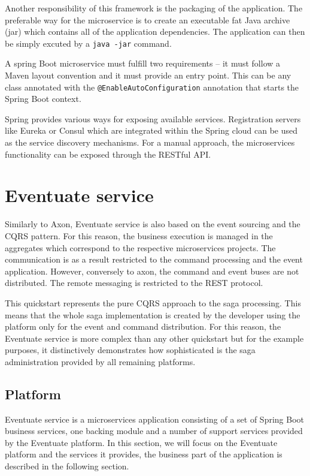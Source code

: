 \documentclass[oneside,
  digital, %
  table,   %
  nolof,     %
  nolot,     %
]{fithesis3}
\begin{document}
Another responsibility of this framework is the packaging of the application. The preferable way for the microservice is to create an executable fat Java archive (jar) which contains all of the application dependencies. The application can then be simply excuted by a \texttt{java -jar} command.

A spring Boot microservice must fulfill two requirements -- it must follow a Maven layout convention and it must provide an entry point. This can be any class annotated with the \texttt{@EnableAutoConfiguration} annotation that starts the Spring Boot context.

Spring provides various ways for exposing available services. Registration servers like Eureka or Consul which are integrated within the Spring cloud \cite{spring_cloud} can be used as the service discovery mechanisms. For a manual approach, the microservices functionality can be exposed through the RESTful API.



\section{Eventuate service}

Similarly to Axon, Eventuate service is also based on the event sourcing and the CQRS pattern. For this reason, the business execution is managed in the aggregates which correspond to the respective microservices projects. The communication is as a result restricted to the command processing and the event application. However, conversely to axon, the command and event buses are not distributed. The remote messaging is restricted to the REST protocol.

This quickstart represents the pure CQRS approach to the saga processing. This means that the whole saga implementation is created by the developer using the platform only for the event and command distribution. For this reason, the Eventuate service is more complex than any other quickstart but for the example purposes, it distinctively demonstrates how sophisticated is the saga administration provided by all remaining platforms.

\subsection{Platform}
\label{sec:eventuate-platform}

Eventuate service is a microservices application consisting of a set of Spring Boot \cite{spring_boot} business services, one backing module and a number of support services provided by the Eventuate platform. In this section, we will focus on the Eventuate platform and the services it provides, the business part of the application is described in the following section.
\end{document}
